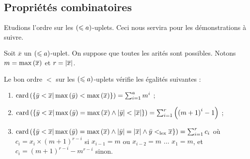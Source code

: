 		
		
		\subsection{Propriétés combinatoires}
		\label{subsec:bon_ordre_prop_combinatoires}
		
		Etudions l'ordre sur les $\left( \leqslant a \right)$-uplets. Ceci nous servira pour les démonstrations à suivre. 
		
		\begin{prop}
			\label{prop:bon_ordre_combinatoire}
			Soit $\overline{x}$ un $\left( \leqslant a \right)$-uplet. On suppose que toutes les arités sont possibles. Notons $m = \max\left( \overline{x} \right)$ et $r = \left|\overline{x}\right|$.
			
			Le bon ordre $<$ sur les $\left( \leqslant a \right)$-uplets vérifie les égalités suivantes :
			
			\begin{enumerate}
				\item 	\label{itm:bon_ordre_combinatoire1} 
						$\text{card}\left( \left\lbrace \bar{y} < \overline{x} | \max\left( \bar{y} \right) < \max\left( \overline{x} \right) \right\rbrace \right) = \sum_{i=1}^{a} m^i$ ;
						
				\item 	\label{itm:bon_ordre_combinatoire2} 
						$\text{card}\left( \left\lbrace \bar{y} < \overline{x} | \max\left( \bar{y} \right) = \max\left( \overline{x} \right) \wedge \left|\bar{y}\right| < \left|\overline{x}\right|  \right\rbrace \right) = \sum_{i=1}^{r} \left( \left(m+1\right)^i -1 \right)$ ; 
						
				\item 	\label{itm:bon_ordre_combinatoire3} 
						$\text{card}\left( \left\lbrace \bar{y} < \overline{x} | \max\left( \bar{y} \right) = \max\left( \overline{x} \right) \wedge \left|\bar{y}\right| = \left|\overline{x}\right| \wedge \bar{y} <_{\text{lex}} \overline{x}  \right\rbrace \right) = \sum_{i=1}^{r} c_i$ où $c_i = x_i \times \left(m+1\right)^{r-i}$ si $x_{i-1} = m$ ou $x_{i-2} = m$ $\dots$ $x_{1} = m$, et $c_i = \left(m+1\right)^{r-i}-m^{r-i}$ sinon. 
			\end{enumerate}
		\end{prop}
		
